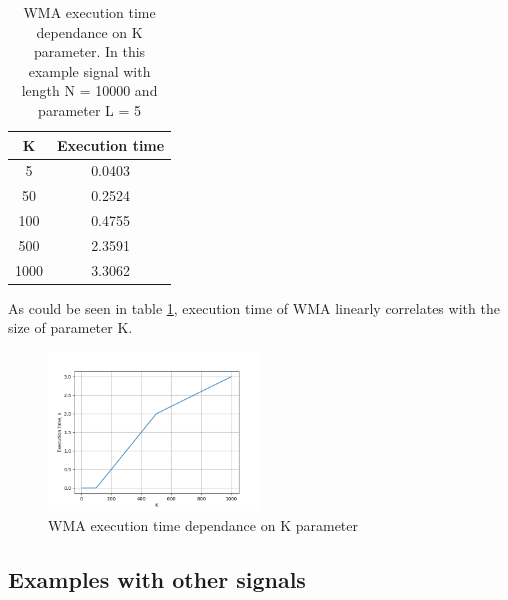 \documentclass[a4paper,12pt,fleqn]{article}
\begin{document}
\begin{table}[ht]
    \centering
\begin{tabular}{|c|c|}
    \hline
    K & Execution time \\
    \hline
    5 & 0.0403 \\
    50 & 0.2524 \\
    100 & 0.4755 \\
    500 & 2.3591 \\
    1000 & 3.3062 \\
    \hline
    
\end{tabular}
\caption{WMA execution time dependance on K parameter. In this example signal with length N = 10000 and parameter L = 5}
\label{tab:WMA_execution_time}
\end{table}
\hspace{1 em} As could be seen in table \ref{tab:WMA_execution_time}, execution time of WMA linearly correlates with 
the size of parameter K.
\begin{figure}[ht]
    \centering
    \includegraphics[width=0.5\textwidth]{images/WMA_exec_time.png} %
    \caption{WMA execution time dependance on K parameter}
    \label{fig:execution_time}
\end{figure}


\newpage
                \subsection{Examples with other signals}
\end{document}
